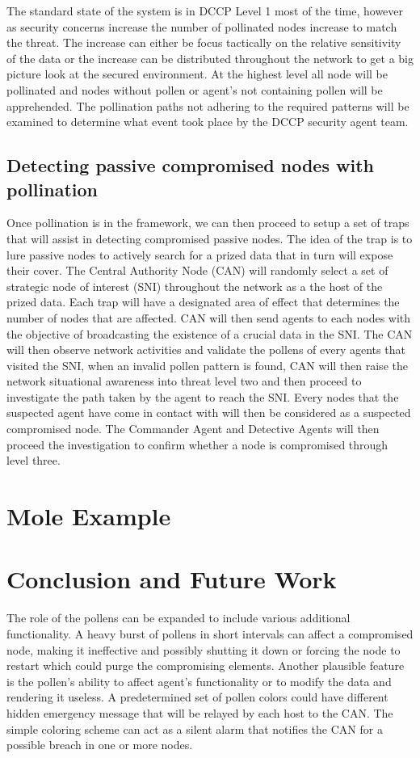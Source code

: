 \documentclass{acm_proc_article-sp}
\begin{document}
The standard state of the system is in DCCP Level 1 most of the time, however as security concerns increase the number of pollinated nodes increase to match the threat. The increase can either be focus tactically on the relative sensitivity of the data or the increase can be distributed throughout the network to get a big picture look at the secured environment. At the highest level all node will be pollinated and nodes without pollen or agent’s not containing pollen will be apprehended. The pollination paths not adhering to the required patterns will be examined to determine what event took place by the DCCP security agent team.

\subsection{Detecting passive compromised nodes with pollination}
Once pollination is in the framework, we can then proceed to setup a set of traps that will assist in detecting compromised passive nodes. The idea of the trap is to lure passive nodes to actively search for a  prized data that in turn will expose their cover. The Central Authority Node (CAN) will randomly select a set of strategic node of interest (SNI) throughout the network as a the host of the prized data. Each trap will have a designated area of effect that determines the number of nodes that are affected. CAN will then send agents to each nodes with the objective of broadcasting the existence of a crucial data in the SNI. The CAN will then observe network activities and validate the pollens of every agents that visited the SNI, when an invalid pollen pattern is found, CAN will then raise the network situational awareness into threat level two and then proceed to investigate the path taken by the agent to reach the SNI. Every nodes that the suspected agent have come in contact with will then be considered as a suspected compromised node. The Commander Agent and Detective Agents will then proceed the investigation to confirm whether a node is compromised through level three. 

\section{Mole Example}

\section{Conclusion and Future Work}
The role of the pollens can be expanded to include various additional functionality. A heavy burst of pollens in short intervals can affect a compromised node, making it ineffective and possibly shutting it down or forcing the node to restart which could purge the compromising elements. Another plausible feature is the pollen’s ability to affect agent’s functionality or to modify the data and rendering it useless. A predetermined set of pollen colors could have different hidden emergency message that will be relayed by each host to the CAN. The simple coloring scheme can act as a silent alarm that notifies the CAN for a possible breach in one or more nodes.
\end{document}
